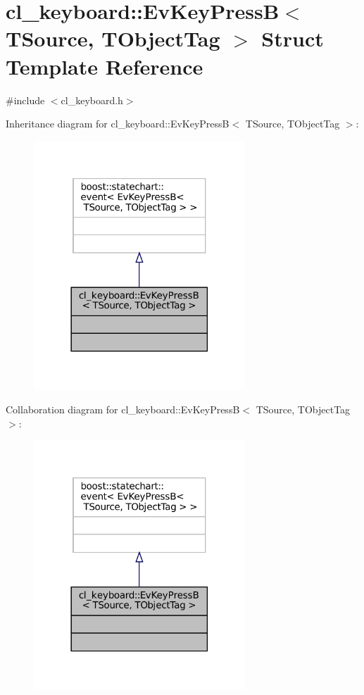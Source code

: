 \hypertarget{structcl__keyboard_1_1EvKeyPressB}{}\section{cl\+\_\+keyboard\+:\+:Ev\+Key\+PressB$<$ T\+Source, T\+Object\+Tag $>$ Struct Template Reference}
\label{structcl__keyboard_1_1EvKeyPressB}


{\ttfamily \#include $<$cl\+\_\+keyboard.\+h$>$}



Inheritance diagram for cl\+\_\+keyboard\+:\+:Ev\+Key\+PressB$<$ T\+Source, T\+Object\+Tag $>$\+:
\nopagebreak
\begin{figure}[H]
\begin{center}
\leavevmode
\includegraphics[width=225pt]{structcl__keyboard_1_1EvKeyPressB__inherit__graph}
\end{center}
\end{figure}


Collaboration diagram for cl\+\_\+keyboard\+:\+:Ev\+Key\+PressB$<$ T\+Source, T\+Object\+Tag $>$\+:
\nopagebreak
\begin{figure}[H]
\begin{center}
\leavevmode
\includegraphics[width=225pt]{structcl__keyboard_1_1EvKeyPressB__coll__graph}
\end{center}
\end{figure}


